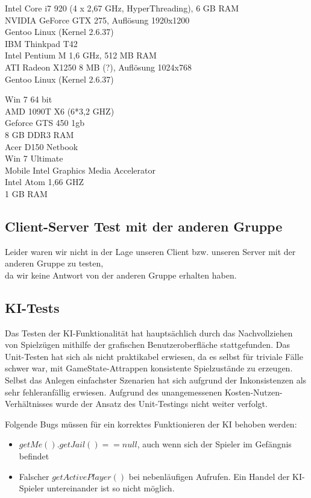 \documentclass[a4paper,10pt]{article}
\begin{document}
Intel Core i7 920 (4 x 2,67 GHz, HyperThreading), 6 GB RAM \\
NVIDIA GeForce GTX 275, Auflösung 1920x1200\\
Gentoo Linux (Kernel 2.6.37)\\

IBM Thinkpad T42\\
Intel Pentium M 1,6 GHz, 512 MB RAM\\
ATI Radeon X1250 8 MB (?), Auflösung 1024x768\\
Gentoo Linux (Kernel 2.6.37)

Win 7 64 bit \\
AMD 1090T X6 (6*3,2 GHZ) \\
Geforce GTS 450 1gb \\
8 GB DDR3 RAM \\

Acer D150 Netbook\\
Win 7 Ultimate\\
Mobile Intel Graphics Media Accelerator\\
Intel Atom 1,66 GHZ\\
1 GB RAM

\subsection{Client-Server Test mit der anderen Gruppe}
Leider waren wir nicht in der Lage unseren Client bzw. unseren Server mit der anderen Gruppe zu testen, \\
da wir keine Antwort von der anderen Gruppe erhalten haben.

\subsection{KI-Tests}
Das Testen der KI-Funktionalität hat hauptsächlich durch das Nachvollziehen von Spielzügen mithilfe der grafischen Benutzeroberfläche stattgefunden. Das Unit-Testen hat sich als nicht praktikabel erwiesen,
da es selbst für triviale Fälle schwer war, mit GameState-Attrappen konsistente Spielzustände zu erzeugen. Selbst das Anlegen einfachster Szenarien hat sich aufgrund der Inkonsistenzen als sehr fehleranfällig erwiesen.
Aufgrund des unangemessenen Kosten-Nutzen-Verhältnisses wurde der Ansatz des Unit-Testings nicht weiter verfolgt.

Folgende Bugs müssen für ein korrektes Funktionieren der KI behoben werden:
\begin{itemize}
 \item $getMe().getJail() == null$, auch wenn sich der Spieler im Gefängnis befindet
 \item Falscher $getActivePlayer()$ bei nebenläufigen Aufrufen. Ein Handel der KI-Spieler untereinander ist so nicht möglich.
\end{itemize}
\end{document}
